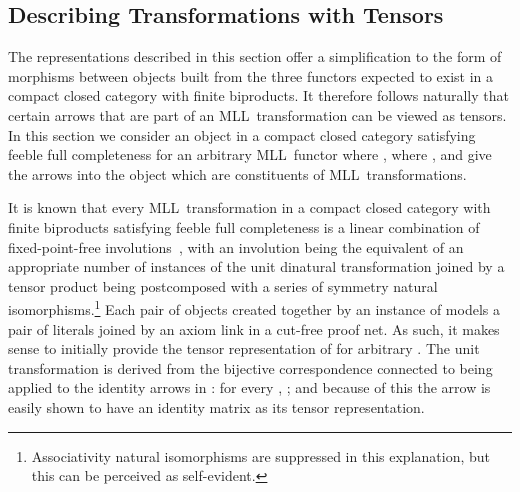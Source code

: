 \documentclass{LMCS}
\theoremstyle{plain}\newtheorem*{cLm}{Claim}
\newcommand{\mll}{MLL} \newcommand{\mall}{MALL}
\newcommand{\p}{} \newcommand{\N}{\mathbb{N}}
\newcommand{\hugh}[1]{#1}
\begin{document}
\subsection{Describing Transformations with Tensors} \label{SectionTransExtensors}

The representations described in this \hugh{section} offer a simplification to the form of morphisms between objects built from the three functors expected to exist in a compact closed category with finite biproducts. It therefore follows naturally that certain arrows that are part of an \mll~transformation can be viewed as tensors. In this section we consider an object  in a compact closed category  satisfying feeble full completeness for an arbitrary \mll~functor  where , \hugh{where ,} and give the arrows into the object which are constituents of \mll~transformations.

\p It is known that every \mll~transformation in a compact closed category with finite biproducts satisfying feeble full completeness is a linear combination of fixed-point-free involutions~\cite{CHS01}, with an involution being the equivalent of an appropriate number of instances of the unit dinatural transformation  joined by a tensor product being postcomposed with a series of symmetry natural isomorphisms.\footnote{Associativity natural isomorphisms are suppressed in this explanation, but this can be perceived as self-evident.} Each pair of objects created together by an instance of  models a pair of literals joined by an axiom link in a cut-free proof net. As such, it makes sense to initially provide the tensor representation of  for arbitrary . The unit transformation is derived from the bijective correspondence connected to  being applied to the identity arrows in : for every , ; and because of this the arrow  is easily shown to have an  identity matrix as its tensor representation.
\end{document}
